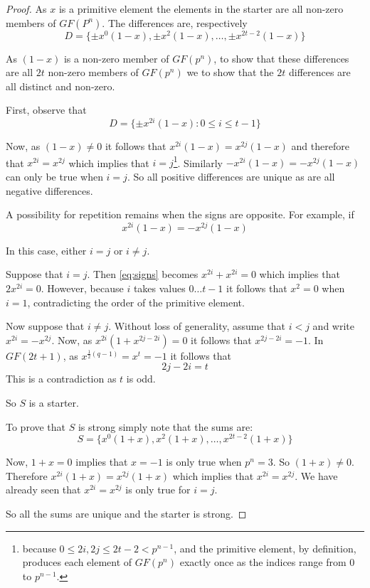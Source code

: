 \begin{proof}
As $x$ is a primitive element the elements in the starter are all non-zero members of $GF(P^n)$.
The differences are, respectively
\begin{equation*}
  D = \{\pm x^0(1 - x), \pm x^2 (1 - x), \ldots, \pm x^{2t - 2}(1 - x)\}
\end{equation*}

As $(1 - x)$ is a non-zero member of $GF(p^n)$, to show that these differences are all $2t$ non-zero members of $GF(p^n)$ we to show that the $2t$ differences are all distinct and non-zero.

First, observe that
\begin{equation*}
D = \{\pm x^{2i}(1 - x) : 0 \leq i \leq t - 1\}
\end{equation*}

Now, as $(1 - x) \neq 0$ it follows that $x^{2i}(1 - x) = x^{2j}(1 - x)$ and therefore that
$x^{2i} = x^{2j}$ which implies that $i = j$\footnote{because $0 \leq 2i, 2j \leq 2t - 2 < p^{n - 1}$, and the primitive element, by definition, produces each element of $GF(p^n)$ exactly once as the indices range from 0 to $p^{n - 1}$.}.
Similarly
$-x^{2i}(1 - x) = -x^{2j}(1 - x)$ can only be true when $i = j$.
So all positive differences are unique as are all negative differences.

A possibility for repetition remains when the signs are opposite.
For example, if
\begin{equation}
\label{eq:signs}
x^{2i}(1 - x) = -x^{2j}(1 - x)
\end{equation}

In this case, either $i = j$ or $i \neq j$.

Suppose that $i = j$.
Then \eqref{eq:signs} becomes $x^{2i} + x^{2i} = 0$ which implies that $2x^{2i} = 0$.
However, because $i$ takes values $0 \ldots t - 1$ it follows that $x^2 = 0$ when $i = 1$, contradicting the order of the primitive element.

Now suppose that $i \neq j$.
Without loss of generality, assume that $i < j$ and write $x^{2i} = -x^{2j}$.
Now, as $x^{2i}(1 + x^{2j - 2i}) = 0$ it follows that $x^{2j - 2i} = -1$.
In $GF(2t + 1)$, as $x^{\frac{1}{2}(q - 1)} = x^{t} = -1$ it follows that
\begin{equation*}
2j - 2i = t
\end{equation*}
This is a contradiction as $t$ is odd.

So $S$ is a starter.

To prove that $S$ is strong simply note that the sums are:
\begin{equation*}
  S = \{x^0(1 + x), x^2(1 + x), \ldots, x^{2t - 2}(1 + x)\}
\end{equation*}

Now, $1 + x = 0$ implies that $x = -1$ is only true when $p^{n} = 3$.
So $(1 + x) \neq 0$.
Therefore $x^{2i}(1 + x) = x^{2j}(1 + x)$ which implies that $x^{2i} = x^{2j}$.
We have already seen that $x^{2i} = x^{2j}$ is only true for $i = j$.

So all the sums are unique and the starter is strong.
\end{proof}

